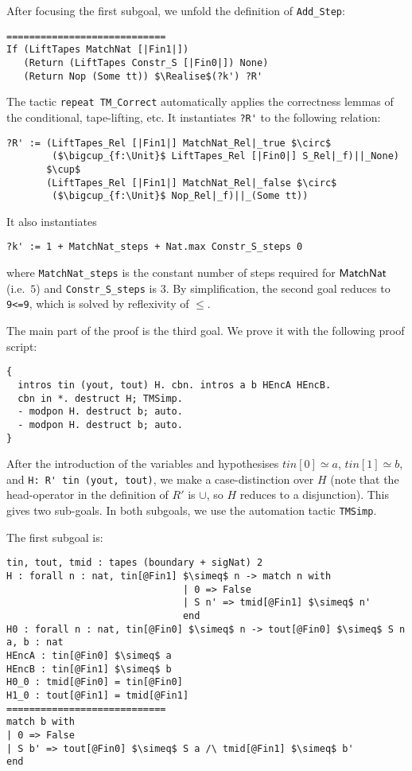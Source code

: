 After focusing the first subgoal, we unfold the definition of \lstinline!Add_Step!:
\begin{lstlisting}
============================
If (LiftTapes MatchNat [|Fin1|])
   (Return (LiftTapes Constr_S [|Fin0|]) None)
   (Return Nop (Some tt)) $\Realise$(?k') ?R'
\end{lstlisting}

The tactic \lstinline!repeat TM_Correct! automatically applies the correctness lemmas of the conditional, tape-lifting, etc.  It instantiates
\lstinline!?R'! to the following relation:
\begin{lstlisting}
?R' := (LiftTapes_Rel [|Fin1|] MatchNat_Rel|_true $\circ$
        ($\bigcup_{f:\Unit}$ LiftTapes_Rel [|Fin0|] S_Rel|_f)||_None)
       $\cup$
       (LiftTapes_Rel [|Fin1|] MatchNat_Rel|_false $\circ$
        ($\bigcup_{f:\Unit}$ Nop_Rel|_f)||_(Some tt))
\end{lstlisting}
It also instantiates
\begin{lstlisting}
?k' := 1 + MatchNat_steps + Nat.max Constr_S_steps 0
\end{lstlisting}
where \lstinline!MatchNat_steps! is the constant number of steps required for $\mathsf{MatchNat}$ (i.e.\ $5$) and \lstinline!Constr_S_steps! is $3$.  By
simplification, the second goal reduces to \lstinline!9<=9!, which is solved by reflexivity of $\leq$.

The main part of the proof is the third goal.  We prove it with the following proof script:
\begin{lstlisting}
{
  intros tin (yout, tout) H. cbn. intros a b HEncA HEncB.
  cbn in *. destruct H; TMSimp.
  - modpon H. destruct b; auto.
  - modpon H. destruct b; auto.
}
\end{lstlisting}

After the introduction of the variables and hypothesises $tin[0] \simeq a$, $tin[1] \simeq b$, and \lstinline!H: R' tin (yout, tout)!, we make a
case-distinction over $H$ (note that the head-operator in the definition of $R'$ is $\cup$, so $H$ reduces to a disjunction).  This gives two
sub-goals.  In both subgoals, we use the automation tactic \lstinline!TMSimp!.

The first subgoal is:
\begin{lstlisting}
tin, tout, tmid : tapes (boundary + sigNat) 2
H : forall n : nat, tin[@Fin1] $\simeq$ n -> match n with
                               | 0 => False
                               | S n' => tmid[@Fin1] $\simeq$ n'
                               end
H0 : forall n : nat, tin[@Fin0] $\simeq$ n -> tout[@Fin0] $\simeq$ S n
a, b : nat
HEncA : tin[@Fin0] $\simeq$ a
HEncB : tin[@Fin1] $\simeq$ b
H0_0 : tmid[@Fin0] = tin[@Fin0]
H1_0 : tout[@Fin1] = tmid[@Fin1]
============================
match b with
| 0 => False
| S b' => tout[@Fin0] $\simeq$ S a /\ tmid[@Fin1] $\simeq$ b'
end
\end{lstlisting}

